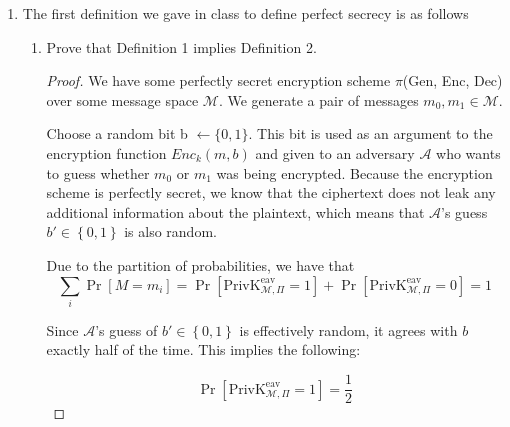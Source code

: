 \documentclass{article}
\begin{document}
\begin{enumerate}
\begin{enumerate}
\begin{proof}
        \begin{align*}
          P[M = m | C = c_1] &= \frac{P[M = m \cap C = c_1]}{P[c_1]}
        \end{align*}

        The denominators are the same because any ciphertext is equally likely to occur, so the numerators are also the same. As a result, we have shown $P[M = m | C = c_0] = P[M = m | C = c_1]$.
        
        \end{proof}
        
    \end{enumerate}
  \item The first definition we gave in class to define perfect secrecy is as follows
    \begin{enumerate}
      \item Prove that Definition 1 implies Definition 2.

        \begin{proof}
          We have some perfectly secret encryption scheme $\pi$(Gen, Enc, Dec) over some message 
          space $\mathcal{M}$. We generate a pair of messages 
          $m_0, m_1 \in \mathcal{M}$.\newline

          Choose a random bit b $\leftarrow \{0, 1\}$. This bit is used as an argument to the encryption function $Enc_k(m, b)$ and given to an adversary $\mathcal{A}$ who wants to guess whether $m_0$ or $m_1$ was being encrypted. Because the encryption scheme is perfectly secret, we know that the ciphertext does not leak any additional information about the plaintext, which means that $\mathcal{A}$'s guess $b' \in \left\{0, 1\right\}$ is also random.\newline
          
            Due to the partition of probabilities, we have that
          \[
            \sum\limits_i \Pr[M = m_i] =  
            \Pr[\text{PrivK}_{\mathcal{M}, \Pi}^{\text{eav}} = 1] + 
            \Pr[\text{PrivK}_{\mathcal{M}, \Pi}^{\text{eav}} = 0] = 1
          \]
          
          Since $\mathcal{A}$'s guess of $b' \in \left\{0, 1\right\}$ is effectively random, it agrees with $b$ exactly half of the time. This implies the following: 

          \[
            \Pr[\text{PrivK}_{\mathcal{M}, \Pi}^{\text{eav}} = 1] = \frac{1}{2}
          \]
         
        \end{proof}


\end{enumerate}
\end{enumerate}
\end{document}
